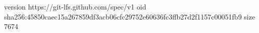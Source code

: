 version https://git-lfs.github.com/spec/v1
oid sha256:45850caec15a267859df3acb06cfc29752e60636fc3ffb27d2f1157c00051fb9
size 7674
